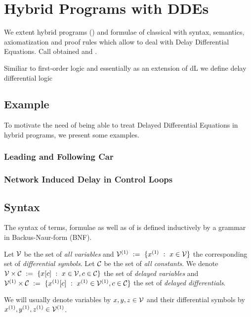 \chapter{Hybrid Programs with DDEs}\label{hybrid-programs-with-ddes}

We extent hybrid programs (\HPs) and formulae of classical \dL with syntax, semantics, axiomatization and proof rules which allow to deal with Delay Differential Equations.
Call obtained \dHPs and \ddL.

Similiar to first-order logic and essentially as an extension of dL we define delay differential logic

\cite{Platzer12Complete,Platzer15Uniform}

\section{Example}
    \label{example-hp-cars}
    To motivate the need of being able to treat Delayed Differential Equations in hybrid programs, we present some examples.

    \subsection{Leading and Following Car}

    \subsection{Network Induced Delay in Control Loops}

\section{Syntax}
    \label{sec:syntax}

    The syntax of \ddL terms, formulae as well as of \dHPs is defined inductively by a grammar in Backus-Naur-form (BNF).

    Let $\mathcal{V}$ be the set of \emph{all variables} and $\diffvars\defeq\{\D{x} \with x\in\allvars\}$ the corresponding set of \emph{differential symbols}.
    Let $\mathcal{C}_{}$ be the set of \emph{all constants}. We denote $\mathcal{V}\times\mathcal{C}_{}~\mathrel{\mathop{:}}=~\{x[c] ~\mathrel{\mathop{:}}~ x\in\mathcal{V}, c\in\mathcal{C}_{}\}$ the set of \emph{delayed variables} and $\diffvars\times\constants\defeq\{\Dxtau[c] \with \D{x}\in\diffvars, c\in\constants\}$ the set of \emph{delayed differentials}.

    We will usually denote variables by $x,y,z\in\mathcal{V}$ and their differential symbols by $\D{x},\D{y},\D{z}\in\diffvars$.

